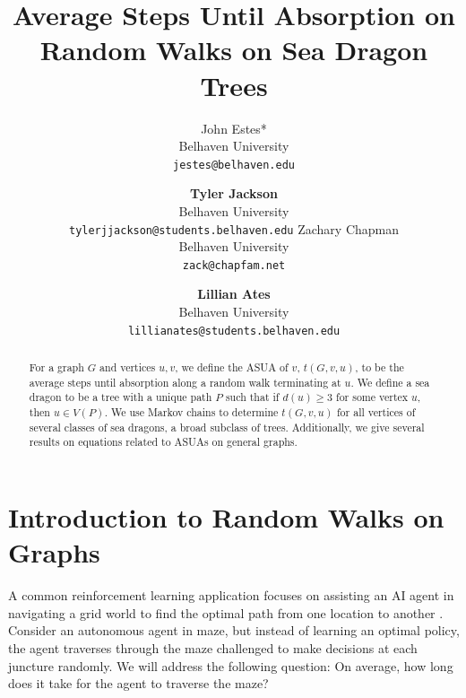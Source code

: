\documentclass{article}
\title{Average Steps Until Absorption on Random Walks on Sea Dragon Trees}
\author{
  John Estes* \\
  Belhaven University \\
  \texttt{jestes@belhaven.edu}
  \and
  \textbf{Tyler Jackson} \\
  Belhaven University \\
  \texttt{tylerjjackson@students.belhaven.edu}
  \AND %
  Zachary Chapman \\
  Belhaven University \\
  \texttt{zack@chapfam.net}
  \and
  \textbf{Lillian Ates} \\
  Belhaven University \\
  \texttt{lillianates@students.belhaven.edu}
}
\theoremstyle{definition}
\begin{document}
\maketitle


\begin{abstract}
For a graph $G$ and vertices $u,v$, we define the ASUA of $v$, $t(G,v,u)$, to be the average steps until absorption along a random walk terminating at $u$. We define a sea dragon to be a tree with a unique path $P$ such that if $d(u) \geq 3$ for some vertex $u$, then $u \in V(P)$. We use Markov chains to determine $t(G,v,u)$ for all vertices of several classes of sea dragons, a broad subclass of trees. Additionally, we give several results on equations related to ASUAs on general graphs. 
\end{abstract}



%

%
\section{Introduction to Random Walks on Graphs}

A common reinforcement learning application focuses on assisting an AI agent in navigating a grid world to find the optimal path from one location to another \cite{barto, russell}. Consider an autonomous agent in maze, but instead of learning an optimal policy, the agent traverses through the maze challenged to make decisions at each juncture randomly. We will address the following question: On average, how long does it take for the agent to traverse the maze?
\end{document}
